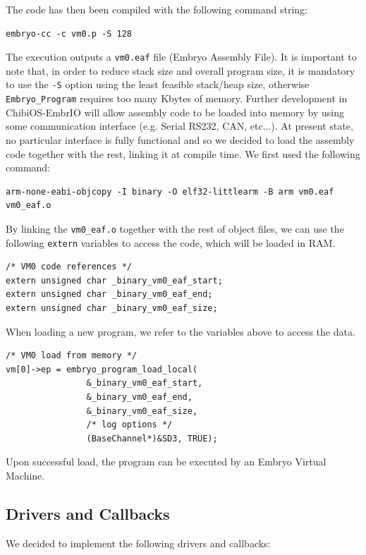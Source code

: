 \documentclass[a4paper,10pt]{article}
\begin{document}
\begin{multicols}{2}
The code has then been compiled with the following command string:
\medskip
\lstset{language=bash}
\begin{lstlisting}[caption={compile command}]
embryo-cc -c vm0.p -S 128
\end{lstlisting}
\medskip
The execution outputs a \texttt{vm0.eaf} file (Embryo Assembly File). It is important to note that, in order to reduce stack size and overall program size, it is mandatory to use the \texttt{-S} option using the least feasible stack/heap size, otherwise \texttt{Embryo\_Program} requires too many Kbytes of memory.
Further development in ChibiOS-EmbrIO will allow assembly code to be loaded into memory by using some communication interface (e.g. Serial RS232, CAN, etc...). At present state, no particular interface is fully functional and so we decided to load the assembly code together with the rest, linking it at compile time. We first used the following command:
\medskip
\lstset{language=bash}
\begin{lstlisting}[caption={object code command}]
arm-none-eabi-objcopy -I binary -O elf32-littlearm -B arm vm0.eaf vm0_eaf.o
\end{lstlisting}
\medskip
By linking the \texttt{vm0\_eaf.o} together with the rest of object files, we can use the following \texttt{extern} variables to access the code, which will be loaded in RAM.
\medskip
\lstset{language=C}
\begin{lstlisting}[caption={code location variables}]
/* VM0 code references */
extern unsigned char _binary_vm0_eaf_start;
extern unsigned char _binary_vm0_eaf_end;
extern unsigned char _binary_vm0_eaf_size;
\end{lstlisting}
\medskip
When loading a new program, we refer to the variables above to access the data.
\medskip
\lstset{language=C}
\begin{lstlisting}[caption={Program load}]
/* VM0 load from memory */
vm[0]->ep = embryo_program_load_local(
				&_binary_vm0_eaf_start,
				&_binary_vm0_eaf_end,
				&_binary_vm0_eaf_size,
				/* log options */
				(BaseChannel*)&SD3, TRUE);
\end{lstlisting}
\medskip
Upon successful load, the program can be executed by an Embryo Virtual Machine.

\subsection{Drivers and Callbacks}
We decided to implement the following drivers and callbacks:


\end{multicols}
\end{document}
